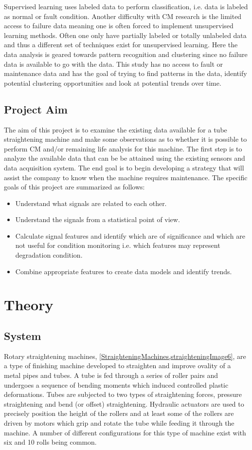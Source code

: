 \documentclass[]{article}
\begin{document}
Supervised learning uses labeled data to perform classification, i.e. data is labeled as normal or fault condition. Another difficulty with \gls{CM} research is the limited access to failure data meaning one is often forced to implement unsupervised learning methods. Often one only have partially labeled or totally unlabeled data and thus a different set of techniques exist for unsupervised learning. Here the data analysis is geared towards pattern recognition and clustering since no failure data is available to go with the data. This study has no access to fault or maintenance data and has the goal of trying to find patterns in the data, identify potential clustering opportunities and look at potential trends over time.

\subsection{Project Aim}
The aim of this project is to examine the existing data available for a tube straightening machine and make some observations as to whether it is possible to perform \gls{CM} and/or remaining life analysis for this machine. The first step is to analyze the available data that can be be attained using the existing sensors and data acquisition system. The end goal is to begin developing a strategy that will assist the company to know when the machine requires maintenance. The specific goals of this project are summarized as follows:
\begin{itemize}
\item Understand what signals are related to each other.
\item Understand the signals from a statistical point of view.
\item Calculate signal features and identify which are of significance and which are not useful for condition monitoring i.e. which features may represent degradation condition.
\item Combine appropriate features to create data models and identify trends.
\end{itemize}
\clearpage  
\section{Theory}
\subsection{System}
Rotary straightening machines, \cref{StraighteningMachines,straighteningImage6}, are a type of finishing machine developed to straighten and improve ovality of a metal pipes and tubes. A tube is fed through a series of roller pairs and undergoes a sequence of bending moments which induced controlled plastic deformations. Tubes are subjected to two types of straightening forces, pressure straightening and bend (or offset) straightening. Hydraulic actuators are used to precisely position the height of the rollers and at least some of the rollers are driven by motors which grip and rotate the tube while feeding it through the machine. A number of different configurations for this type of machine exist with six and 10 rolls being common. 
\end{document}
